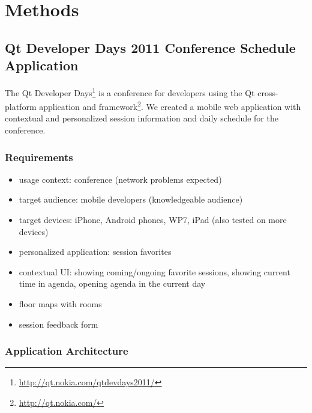 \chapter{Methods}
\label{chapter:methods}

\section{Qt Developer Days 2011 Conference Schedule Application}
\label{section:devdays}

The Qt Developer
Days\footnote{\url{http://qt.nokia.com/qtdevdays2011/}} is a
conference for developers using the Qt cross-platform application and
 framework\footnote{\url{http://qt.nokia.com/}}. We created a
mobile web application with contextual and personalized session
information and daily schedule for the conference.

\subsection{Requirements}

\begin{itemize}
\item usage context: conference (network problems expected)
\item target audience: mobile developers (knowledgeable audience)
\item target devices: iPhone, Android phones, WP7, iPad (also tested
  on more devices)
\item personalized application: session favorites
\item contextual UI: showing coming/ongoing favorite sessions, showing
  current time in agenda, opening agenda in the current day
\item floor maps with rooms
\item session feedback form
\end{itemize}

\subsection{Application Architecture}

